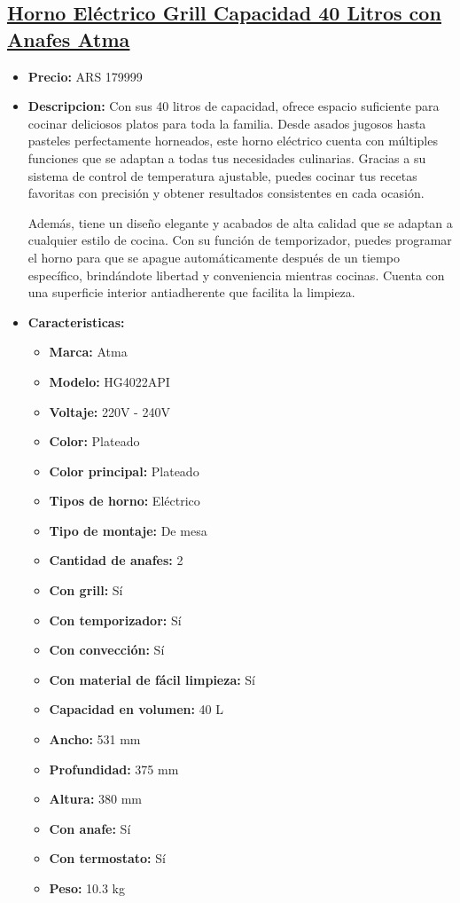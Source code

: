 \documentclass{article}
\begin{document}
    
    \begin{adjustwidth}{2em}{}

    \subsection{\underline{\href{https://www.mercadolibre.com.ar/horno-electrico-grill-capacidad-40-litros-con-anafes-atma/p/MLA23686313}{Horno Eléctrico Grill Capacidad 40 Litros con Anafes Atma}}}
    \begin{itemize}
        \item \textbf{Precio:} ARS 179999
        \item \textbf{Descripcion:} Con sus 40 litros de capacidad, ofrece espacio suficiente para cocinar deliciosos platos para toda la familia. Desde asados jugosos hasta pasteles perfectamente horneados, este horno eléctrico cuenta con múltiples funciones que se adaptan a todas tus necesidades culinarias. Gracias a su sistema de control de temperatura ajustable, puedes cocinar tus recetas favoritas con precisión y obtener resultados consistentes en cada ocasión. 

Además, tiene un diseño elegante y acabados de alta calidad que se adaptan a cualquier estilo de cocina. Con su función de temporizador, puedes programar el horno para que se apague automáticamente después de un tiempo específico, brindándote libertad y conveniencia mientras cocinas. Cuenta con una superficie interior antiadherente que facilita la limpieza.
        \item \textbf{Caracteristicas:} 
        \begin{itemize}
            \item \textbf {Marca:} Atma
    \item \textbf {Modelo:} HG4022API
    \item \textbf {Voltaje:} 220V - 240V
    \item \textbf {Color:} Plateado
    \item \textbf {Color principal:} Plateado
    \item \textbf {Tipos de horno:} Eléctrico
    \item \textbf {Tipo de montaje:} De mesa
    \item \textbf {Cantidad de anafes:} 2
    \item \textbf {Con grill:} Sí
    \item \textbf {Con temporizador:} Sí
    \item \textbf {Con convección:} Sí
    \item \textbf {Con material de fácil limpieza:} Sí
    \item \textbf {Capacidad en volumen:} 40 L
    \item \textbf {Ancho:} 531 mm
    \item \textbf {Profundidad:} 375 mm
    \item \textbf {Altura:} 380 mm
    \item \textbf {Con anafe:} Sí
    \item \textbf {Con termostato:} Sí
    \item \textbf {Peso:} 10.3 kg
        \end{itemize}
    \end{itemize}


\end{adjustwidth}
\end{document}
